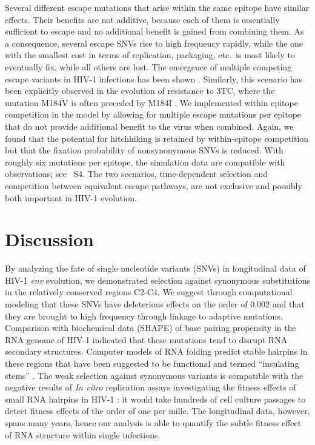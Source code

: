 \documentclass[11pt]{article}
\newcommand{\env}{\textit{env}}
\newcommand{\withinepi}{4}
\begin{document}
Several different escape mutations that arise within the 
same epitope have similar effects. Their benefits
are not additive, because each of them is essentially sufficient to escape and
no additional benefit is gained from combining them. As a consequence, several
escape SNVs rise to high frequency rapidly, while the one with the smallest cost
in terms of replication, packaging, etc.~is most likely to eventually fix, while
all others are lost. The emergence of multiple competing escape variants in HIV-1
infections has been shown \citep{moore_limited_2009, bar_early_2012}. 
Similarly, this scenario has been explicitly observed in the evolution of
resistance to 3TC, where the mutation M184V is often preceded by M184I
\citep{hedskog_dynamics_2010}. We implemented within epitope competition 
in the model by allowing for multiple escape mutations per epitope that do
not provide additional benefit to the virus when combined. Again, we found that the potential for
hitchhiking is retained by within-epitope competition but that the
fixation probability of nonsynonymous SNVs is reduced. With roughly six
mutations per epitope, the simulation data are compatible with observations; see
\figurename~S\withinepi. The two scenarios, time-dependent selection and
competition between equivalent escape pathways, are not exclusive and possibly
both important in HIV-1 evolution.

\section*{Discussion}
By analyzing the fate of single nucleotide variants (SNVs) in
longitudinal data of HIV-1 \env{} evolution, we demonstrated selection
against synonymous substitutions in the relatively conserved regions
C2-C4. We suggest through computational modeling that these
SNVs have deleterious effects on the order of $0.002$ and that they are
brought to high frequency through linkage to adaptive mutations.
Comparison with biochemical data (SHAPE) of base pairing propensity in the RNA
genome of HIV-1 indicated that these mutations tend to disrupt RNA secondary structures\citep{watts_architecture_2009}. Computer models
of RNA folding predict stable hairpins in these regions that
have been suggested to be functional and termed ``insulating
stems'' \citep{watts_architecture_2009, sanjuan_interplay_2011}.
The weak selection against synonymous variants is compatible with the
negative results of \textit{In vitro} replication assays investigating
the fitness effects of small RNA hairpins in HIV-1
\citep{knoepfel_role_2013}: it would take hundreds of cell culture
passages to detect fitness effects of the order of one per mille. The longitudinal data,
however, spans many years, hence our analysis is able to quantify the
subtle fitness effect of RNA structure within single infections.
\end{document}
